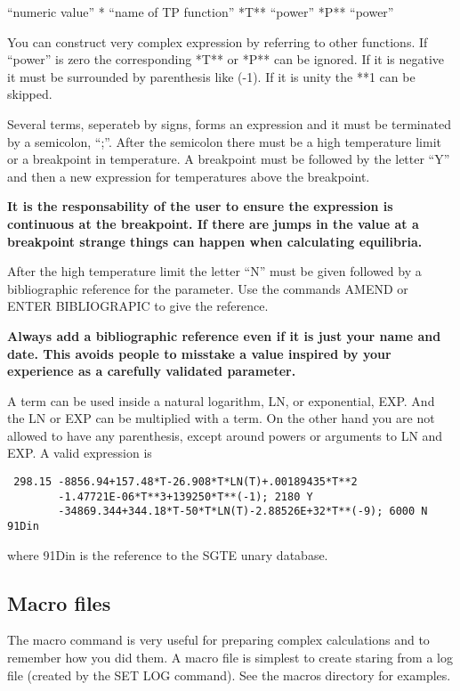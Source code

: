 \documentclass[12pt]{article}
\begin{document}
``numeric value'' * ``name of TP function'' *T** ``power'' *P** ``power'' 

You can construct very complex expression by referring to other
functions.
If ``power'' is zero the corresponding *T** or *P** can be ignored.  If
it is negative it must be surrounded by parenthesis like (-1).  If it
is unity the **1 can be skipped.

Several terms, seperateb by signs, forms an expression and it must be
terminated by a semicolon, ``;''.  After the semicolon there must be a
high temperature limit or a breakpoint in temperature.  A breakpoint
must be followed by the letter ``Y'' and then a new expression for
temperatures above the breakpoint.  

{\bf It is the responsability of the user to ensure the expression is
  continuous at the breakpoint.  If there are jumps in the value at a
  breakpoint strange things can happen when calculating equilibria.}

After the high temperature limit the letter ``N'' must be given
followed by a bibliographic reference for the parameter.  Use the
commands AMEND or ENTER BIBLIOGRAPIC to give the reference.

{\bf Always add a bibliographic reference even if it is just your name
  and date.  This avoids people to misstake a value inspired by your
  experience as a carefully validated parameter.}

A term can be used inside a natural logarithm, LN, or exponential,
EXP. And the LN or EXP can be multiplied with a term.  On the other
hand you are not allowed to have any parenthesis, except around powers
or arguments to LN and EXP.  A valid expression is

\begin{verbatim}
 298.15 -8856.94+157.48*T-26.908*T*LN(T)+.00189435*T**2
        -1.47721E-06*T**3+139250*T**(-1); 2180 Y 
        -34869.344+344.18*T-50*T*LN(T)-2.88526E+32*T**(-9); 6000 N 91Din
\end{verbatim}

where 91Din is the reference to the SGTE unary database.

\subsection{Macro files}

The macro command is very useful for preparing complex calculations
and to remember how you did them.  A macro file is simplest to create
staring from a log file (created by the SET LOG command).  See the
macros directory for examples.
\end{document}
